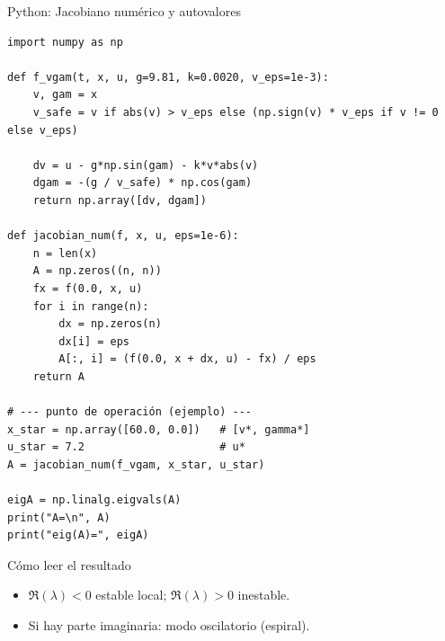 \documentclass[aspectratio=169,10pt]{beamer}
\newcommand{\importantbox}[2][Importante]{%
\begin{alertblock}{#1}#2\end{alertblock}}
\begin{document}
\begin{frame}[fragile]{Python: Jacobiano numérico y autovalores}
\small

\begin{lstlisting}[style=pythonstyle]
import numpy as np

def f_vgam(t, x, u, g=9.81, k=0.0020, v_eps=1e-3):
    v, gam = x
    v_safe = v if abs(v) > v_eps else (np.sign(v) * v_eps if v != 0 else v_eps)

    dv = u - g*np.sin(gam) - k*v*abs(v)
    dgam = -(g / v_safe) * np.cos(gam)
    return np.array([dv, dgam])

def jacobian_num(f, x, u, eps=1e-6):
    n = len(x)
    A = np.zeros((n, n))
    fx = f(0.0, x, u)
    for i in range(n):
        dx = np.zeros(n)
        dx[i] = eps
        A[:, i] = (f(0.0, x + dx, u) - fx) / eps
    return A

# --- punto de operación (ejemplo) ---
x_star = np.array([60.0, 0.0])   # [v*, gamma*]
u_star = 7.2                     # u*
A = jacobian_num(f_vgam, x_star, u_star)

eigA = np.linalg.eigvals(A)
print("A=\n", A)
print("eig(A)=", eigA)
\end{lstlisting}

\importantbox[Cómo leer el resultado]{
\begin{itemize}
\item $\Re(\lambda)<0$ estable local; $\Re(\lambda)>0$ inestable.
\item Si hay parte imaginaria: modo oscilatorio (espiral).
\end{itemize}
}

\end{frame}
\end{document}
